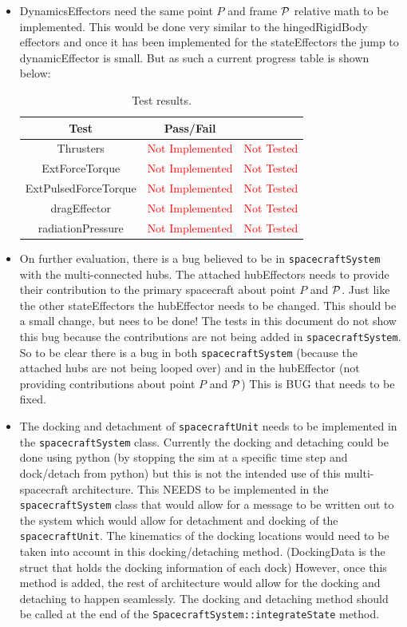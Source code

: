 \begin{itemize}
\item DynamicsEffectors need the same point $P$ and frame $\cal P$ relative math to be implemented. This would be done very similar to the hingedRigidBody effectors and once it has been implemented for the stateEffectors the jump to dynamicEffector is small. But as such a current progress table is shown below:

\begin{table}[htbp]
	\caption{Test results.}
	\label{tab:results2}
	\centering \fontsize{10}{10}\selectfont
	\begin{tabular}{c | c | c } %
		\hline
		\textbf{Test} 				    & \textbf{Pass/Fail} &  \\ \hline
		Thrusters  & \textcolor{Red}{Not Implemented} & \textcolor{Red}{Not Tested} \\ 
		ExtForceTorque  & \textcolor{Red}{Not Implemented} & \textcolor{Red}{Not Tested} \\ 
		ExtPulsedForceTorque  & \textcolor{Red}{Not Implemented} & \textcolor{Red}{Not Tested} \\ 
		dragEffector  & \textcolor{Red}{Not Implemented} & \textcolor{Red}{Not Tested} \\ 
		radiationPressure  & \textcolor{Red}{Not Implemented} & \textcolor{Red}{Not Tested} \\ 
		\hline
	\end{tabular}
\end{table}

\item On further evaluation, there is a bug believed to be in {\tt spacecraftSystem} with the multi-connected hubs. The attached hubEffectors needs to provide their contribution to the primary spacecraft about point $P$ and $\cal P$. Just like the other stateEffectors the hubEffector needs to be changed. This should be a small change, but nees to be done! The tests in this document do not show this bug because the contributions are not being added in {\tt spacecraftSystem}. So to be clear there is a bug in both {\tt spacecraftSystem} (because the attached hubs are not being looped over) and in the hubEffector (not providing contributions about point $P$ and $\cal P$) This is BUG that needs to be fixed.
 
\item The docking and detachment of {\tt spacecraftUnit} needs to be implemented in the {\tt spacecraftSystem} class. Currently the docking and detaching could be done using python (by stopping the sim at a specific time step and dock/detach from python) but this is not the intended use of this multi-spacecraft architecture. This NEEDS to be implemented in the {\tt spacecraftSystem} class that would allow for a message to be written out to the system which would allow for detachment and docking of the {\tt spacecraftUnit}. The kinematics of the docking locations would need to be taken into account in this docking/detaching method. (DockingData is the struct that holds the docking information of each dock) However, once this method is added, the rest of architecture would allow for the docking and detaching to happen seamlessly. The docking and detaching method should be called at the end of the {\tt SpacecraftSystem::integrateState} method.


\end{itemize}
